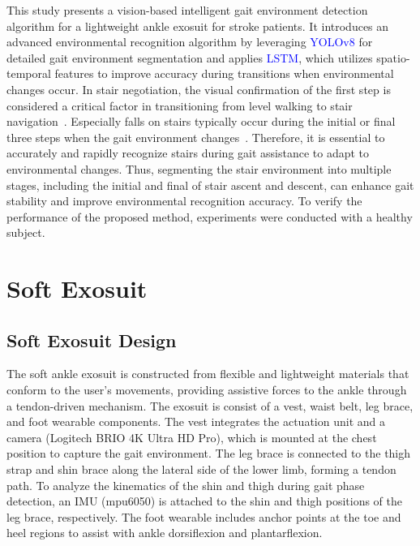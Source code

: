\documentclass[journal,article,submit,pdftex,moreauthors]{Definitions/mdpi}
\begin{document}
This study presents a vision-based intelligent gait environment detection algorithm for a lightweight ankle exosuit for stroke patients. It introduces an advanced environmental recognition algorithm by leveraging \textcolor{blue}{YOLOv8} for detailed gait environment segmentation and applies \textcolor{blue}{LSTM}, which utilizes spatio-temporal features to improve accuracy during transitions when environmental changes occur.
In stair negotiation, the visual confirmation of the first step is considered a critical factor in transitioning from level walking to stair navigation~\cite{Archea1979}. Especially falls on stairs typically occur during the initial or final three steps when the gait environment changes~\cite{Templer1995}. Therefore, it is essential to accurately and rapidly recognize stairs during gait assistance to adapt to environmental changes. 
Thus, segmenting the stair environment into multiple stages, including the initial and final of stair ascent and descent, can enhance gait stability and improve environmental recognition accuracy.
To verify the performance of the proposed method, experiments were conducted with a healthy subject. 


\section{Soft Exosuit}

\subsection{Soft Exosuit Design}
The soft ankle exosuit is constructed from flexible and lightweight materials that conform to the user's movements, providing assistive forces to the ankle through a tendon-driven mechanism. 
The exosuit is consist of a vest, waist belt, leg brace, and foot wearable components. The vest integrates the actuation unit and a camera (Logitech BRIO 4K Ultra HD Pro), which is mounted at the chest position to capture the gait environment.
The leg brace is connected to the thigh strap and shin brace along the lateral side of the lower limb, forming a tendon path. To analyze the kinematics of the shin and thigh during gait phase detection, an IMU (mpu6050) is attached to the shin and thigh positions of the leg brace, respectively. The foot wearable includes anchor points at the toe and heel regions to assist with ankle dorsiflexion and plantarflexion.
\end{document}
